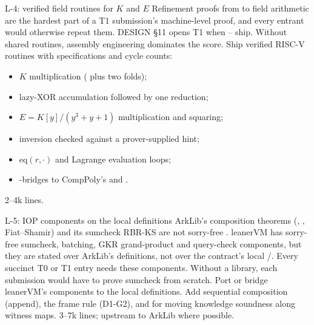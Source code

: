 \begin{issue}{L-4}{: verified field routines for \texorpdfstring{$K$}{K} and \texorpdfstring{$E$}{E}}
\IRprob Refinement proofs from  to field arithmetic are the hardest part of a T1
submission's machine-level proof, and every entrant would otherwise repeat them.
\IRwhy DESIGN §11 opens T1 when -- ship. Without shared routines, assembly
engineering dominates the score.
\IRres Ship verified RISC-V routines with specifications and cycle counts:
\begin{itemize}[nosep]
\item $K$ multiplication ( plus two folds);
\item lazy-XOR accumulation followed by one reduction;
\item $E=K[y]/(y^3+y+1)$ multiplication and squaring;
\item inversion checked against a prover-supplied hint;
\item $\mathrm{eq}(r,\cdot)$ and Lagrange evaluation loops;
\item {}-bridges to CompPoly's  and .
\end{itemize}
2--4k lines.
\end{issue}

\begin{issue}{L-5}{: IOP components on the local definitions}
\IRprob ArkLib's composition theorems (, , Fiat--Shamir) and its
sumcheck RBR-KS are not sorry-free \cite{arklib2026}. leanerVM has sorry-free sumcheck, batching,
GKR grand-product and query-check components, but they are stated over ArkLib's definitions, not
over the contract's local /.
\IRwhy Every succinct T0 or T1 entry needs these components. Without a library, each submission
would have to prove sumcheck from scratch.
\IRres Port or bridge leanerVM's components to the local definitions. Add sequential composition
(append), the frame rule (D1-G2), and  for moving
knowledge soundness along witness maps. 3--7k lines; upstream to ArkLib where possible.
\end{issue}

